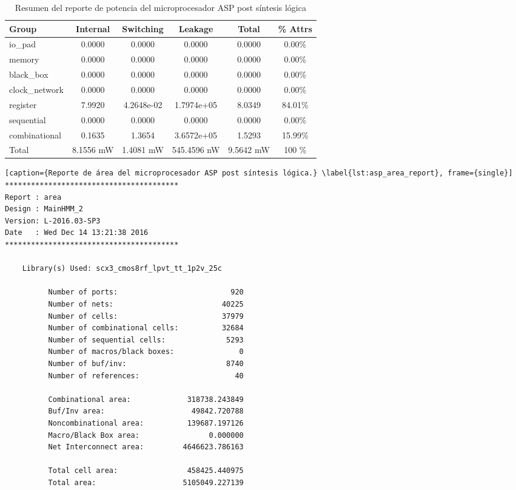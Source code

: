 \begin{table}[ht]
\centering
\label{tab:power_asp}
\caption{Resumen del reporte de potencia del microprocesador ASP post síntesis lógica}
\begin{tabular}{||l | c | c | c | c | c |}
\hline
\hline
Group & Internal & Switching  & Leakage & Total & \% Attrs \\
\hline
io\_pad & 0.0000 & 0.0000 & 0.0000 & 0.0000 & 0.00\% \\
\hline
memory & 0.0000 & 0.0000 & 0.0000 & 0.0000 & 0.00\% \\
\hline
black\_box & 0.0000 & 0.0000 & 0.0000 & 0.0000 & 0.00\% \\
\hline
clock\_network & 0.0000 & 0.0000 & 0.0000 & 0.0000 & 0.00\% \\
\hline
register & 7.9920 & 4.2648e-02 & 1.7974e+05 & 8.0349 & 84.01\%\\
\hline
sequential  & 0.0000 & 0.0000 & 0.0000 & 0.0000 & 0.00\% \\
\hline
combinational & 0.1635 & 1.3654 & 3.6572e+05 & 1.5293 & 15.99\% \\
\hline
Total &  8.1556 mW & 1.4081 mW & 545.4596 nW & 9.5642 mW & 100 \%\\
\hline
\hline
\end{tabular}
\end{table}

\begin{lstlisting}[caption={Reporte de área del microprocesador ASP post síntesis lógica.} \label{lst:asp_area_report}, frame={single}]
****************************************
Report : area
Design : MainHMM_2
Version: L-2016.03-SP3
Date   : Wed Dec 14 13:21:38 2016
****************************************

	Library(s) Used: scx3_cmos8rf_lpvt_tt_1p2v_25c

          Number of ports:                          920
          Number of nets:                         40225
          Number of cells:                        37979
          Number of combinational cells:          32684
          Number of sequential cells:              5293
          Number of macros/black boxes:               0
          Number of buf/inv:                       8740
          Number of references:                      40

          Combinational area:             318738.243849
          Buf/Inv area:                    49842.720788
          Noncombinational area:          139687.197126
          Macro/Black Box area:                0.000000
          Net Interconnect area:         4646623.786163

          Total cell area:                458425.440975
          Total area:                    5105049.227139
\end{lstlisting}

